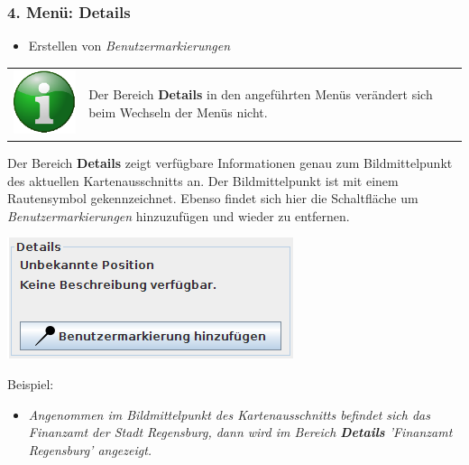 \documentclass[10pt]{scrreprt}
\newcommand{\textref}[1]{\mbox{\raisebox{0.1ex}{\small$\rightarrow$ }\textit{#1}}}
\begin{document}
\vspace{5mm}
\subsubsection{4. Menü: Details}   

\begin{itemize}
\item Erstellen von \textref{Benutzermarkierungen}
\end{itemize}


\vspace{3mm}
\begin{tabular}{>{\centering \arraybackslash}m{1cm} m{14cm}} \index{Menüführung!Menü Details} \index{Menü Details}
\includegraphics[scale=0.5]{images/info.eps} & Der Bereich \textbf{Details} in den angeführten Menüs verändert sich beim Wechseln der Menüs nicht.
\end{tabular}

\vspace{5mm}
\begin{minipage}[t]{9cm}
\vspace{-10mm}
Der Bereich \textbf{Details} zeigt verfügbare Informationen genau zum Bildmittelpunkt des aktuellen Kartenausschnitts an. Der Bildmittelpunkt ist mit einem Rautensymbol gekennzeichnet. Ebenso findet sich hier die Schaltfläche um \textref{Benutzermarkierungen} hinzuzufügen und wieder zu entfernen. \\
\end{minipage}
\begin{minipage}{7cm}
\centering
\includegraphics[scale=0.4]{images/details_menu.png}
\end{minipage}

\vspace{3mm}
Beispiel:
\begin{itemize}
\item \textit{Angenommen im Bildmittelpunkt des Kartenausschnitts befindet sich das Finanzamt der Stadt Regensburg, dann wird im Bereich \textbf{Details} 'Finanzamt Regensburg' angezeigt.}
\end{itemize}
\end{document}
